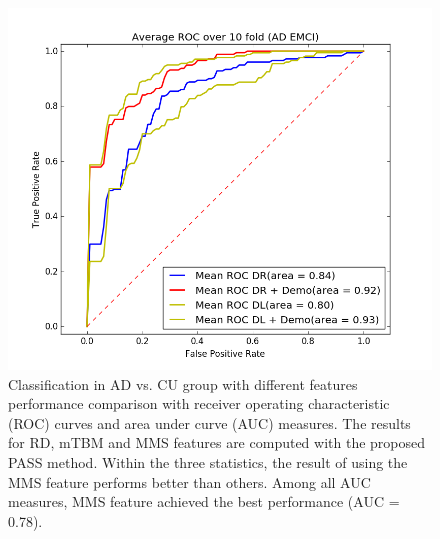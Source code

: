 \begin{figure}
	\centering
	\includegraphics[width=\linewidth]{figures/AD_EMCI}
	\caption[ROC for AD vs. EMCI]{Classification in AD vs. CU group with different features performance comparison with receiver operating characteristic (ROC) curves and area under curve (AUC) measures. The results for RD, mTBM and MMS features are computed with the proposed PASS method. Within the three statistics, the result of using the MMS feature performs better than others. Among all AUC measures, MMS feature achieved the best performance (AUC = 0.78).}
	\label{fig:ademci}
\end{figure}
